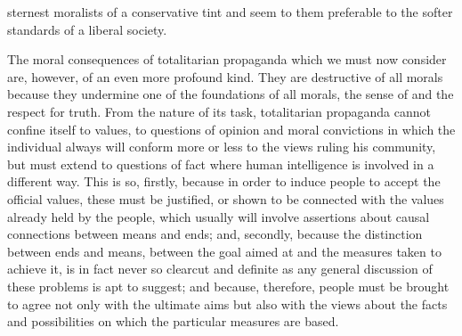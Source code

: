 \documentclass[11pt,openany]{book}
\begin{document}
sternest moralists of a conservative tint and seem to them preferable to the softer standards of a liberal society.

The moral consequences of totalitarian propaganda which we must now consider are, however, of an even more profound kind. They are destructive of all morals because they undermine one of the foundations of all morals, the sense of and the respect for truth. From the nature of its task, totalitarian propaganda cannot confine itself to values, to questions of opinion and moral convictions in which the individual always will conform more or less to the views ruling his community, but must extend to questions of fact where human intelligence is involved in a different way. This is so, firstly, because in order to induce people to accept the official values, these must be justified, or shown to be connected with the values already held by the people, which usually will involve assertions about causal connections between means and ends; and, secondly, because the distinction between ends and means, between the goal aimed at and the measures taken to achieve it, is in fact never so clearcut and definite as any general discussion of these problems is apt to suggest; and because, therefore, people must be brought to agree not only with the ultimate aims but also with the views about the facts and possibilities on which the particular measures are based.

\begin{center}\textasteriskcentered\hspace{0.9em}\textasteriskcentered\hspace{0.9em}\textasteriskcentered\end{center}

\begin{center}\textasteriskcentered\hspace{0.9em}\textasteriskcentered\hspace{0.9em}\textasteriskcentered\end{center}

\begin{center}\textasteriskcentered\hspace{0.9em}\textasteriskcentered\hspace{0.9em}\textasteriskcentered\end{center}

\begin{center}\textasteriskcentered\hspace{0.9em}\textasteriskcentered\hspace{0.9em}\textasteriskcentered\end{center}
\end{document}
